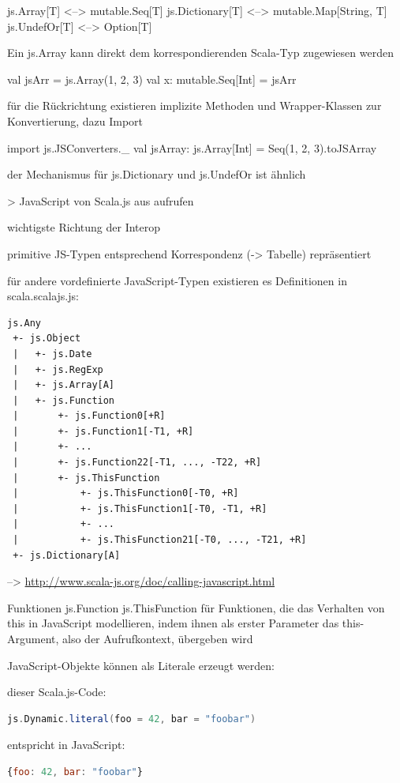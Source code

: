 \documentclass[a4paper, 12pt, hidelinks, listof=totoc, listoftables=totoc, bibliography=totoc]{scrreprt}
\begin{document}
js.Array[T] <--> mutable.Seq[T]
js.Dictionary[T] <--> mutable.Map[String, T]
js.UndefOr[T] <--> Option[T]

Ein js.Array kann direkt dem korrespondierenden Scala-Typ zugewiesen werden

val jsArr = js.Array(1, 2, 3)
val x: mutable.Seq[Int] = jsArr

für die Rückrichtung existieren implizite Methoden und Wrapper-Klassen zur Konvertierung, dazu Import

import js.JSConverters.\_
val jsArray: js.Array[Int] = Seq(1, 2, 3).toJSArray

der Mechanismus für js.Dictionary und js.UndefOr ist ähnlich



> JavaScript von Scala.js aus aufrufen

wichtigste Richtung der Interop

primitive JS-Typen entsprechend Korrespondenz (-> Tabelle) repräsentiert

für andere vordefinierte JavaScript-Typen existieren es Definitionen in scala.scalajs.js:

\begin{lstlisting}
js.Any
 +- js.Object
 |   +- js.Date
 |   +- js.RegExp
 |   +- js.Array[A]
 |   +- js.Function
 |       +- js.Function0[+R]
 |       +- js.Function1[-T1, +R]
 |       +- ...
 |       +- js.Function22[-T1, ..., -T22, +R]
 |       +- js.ThisFunction
 |           +- js.ThisFunction0[-T0, +R]
 |           +- js.ThisFunction1[-T0, -T1, +R]
 |           +- ...
 |           +- js.ThisFunction21[-T0, ..., -T21, +R]
 +- js.Dictionary[A]
\end{lstlisting}
-->  \url{http://www.scala-js.org/doc/calling-javascript.html}


Funktionen
	js.Function
	js.ThisFunction für Funktionen, die das Verhalten von this in JavaScript modellieren, indem ihnen als erster Parameter das this-Argument, also der Aufrufkontext, übergeben wird

JavaScript-Objekte können als Literale erzeugt werden:

dieser Scala.js-Code:
\begin{lstlisting}[language=Scala]
js.Dynamic.literal(foo = 42, bar = "foobar")
\end{lstlisting}

entspricht in JavaScript:
\begin{lstlisting}[language=JavaScript]
{foo: 42, bar: "foobar"}
\end{lstlisting}
\end{document}

